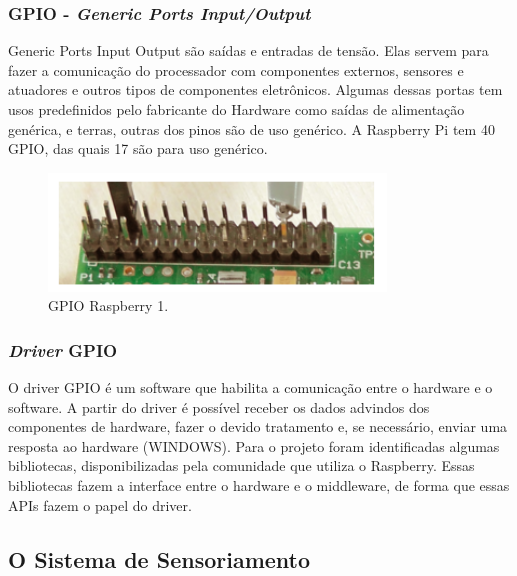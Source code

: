 \subsubsection{GPIO - \textit{Generic Ports Input/Output}}
Generic Ports Input Output são saídas e entradas de tensão. Elas servem para fazer a comunicação do processador com componentes externos, sensores e atuadores e outros tipos de componentes eletrônicos. Algumas dessas portas tem usos predefinidos pelo fabricante do Hardware como saídas de alimentação genérica, e terras, outras dos pinos são de uso genérico. A Raspberry Pi tem 40 GPIO, das quais  17 são para uso genérico.
\par
\begin{figure}[h]
  \centering
  \includegraphics[width=0.8\textwidth]{figures/gpio.png}
  \caption{GPIO Raspberry 1.}
  \label{fig:gpio}
\end{figure}
\FloatBarrier
\par

\subsubsection{\textit{Driver} GPIO}
O driver GPIO é um software que habilita a comunicação entre o hardware e o software. A partir do driver é possível receber  os dados advindos dos componentes de hardware, fazer o devido tratamento e, se necessário, enviar uma resposta ao hardware (WINDOWS). Para o projeto foram identificadas algumas bibliotecas, disponibilizadas pela comunidade que utiliza o Raspberry. Essas bibliotecas fazem a interface entre o hardware e o middleware, de forma que essas APIs fazem o papel do driver.

\subsection{O Sistema de Sensoriamento}
